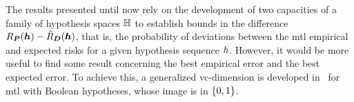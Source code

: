 The results presented until now rely on the development of two capacities of a family of hypothesis spaces $\mathbb{H}$ to establish bounds in the difference $R_{\bm{P}}(\bm{h}) - \hat{R}_{\bm{D}}(\bm{h})$, that is, the probability of deviations between the \acrshort{mtl} empirical and expected risks for a given hypothesis sequence $h$. However, it would be more useful to find some result concerning the best empirical error and the {best expected error}.
To achieve this, a generalized \acrshort{vc}-dimension is developed in~\cite{baxter2000model} for \acrshort{mtl} with Boolean hypotheses, whose image is in $\left\{0, 1\right\}$.
%
